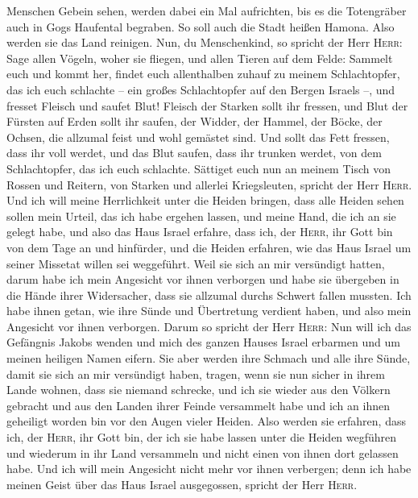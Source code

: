 Menschen Gebein sehen, werden dabei ein Mal aufrichten, bis es die
Totengräber auch in Gogs Haufental begraben.  So soll
auch die Stadt heißen Hamona. Also werden sie das Land reinigen.
 Nun, du Menschenkind, so spricht der Herr \textsc{Herr}:
Sage allen Vögeln, woher sie fliegen, und allen Tieren auf dem Felde:
Sammelt euch und kommt her, findet euch allenthalben zuhauf zu meinem
Schlachtopfer, das ich euch schlachte -- ein großes Schlachtopfer auf
den Bergen Israels --, und fresset Fleisch und saufet Blut!
 Fleisch der Starken sollt ihr fressen, und Blut der
Fürsten auf Erden sollt ihr saufen, der Widder, der Hammel, der Böcke,
der Ochsen, die allzumal feist und wohl gemästet sind. 
Und sollt das Fett fressen, dass ihr voll werdet, und das Blut saufen,
dass ihr trunken werdet, von dem Schlachtopfer, das ich euch schlachte.
 Sättiget euch nun an meinem Tisch von Rossen und
Reitern, von Starken und allerlei Kriegsleuten, spricht der Herr
\textsc{Herr}.  Und ich will meine Herrlichkeit unter die
Heiden bringen, dass alle Heiden sehen sollen mein Urteil, das ich habe
ergehen lassen, und meine Hand, die ich an sie gelegt habe,
 und also das Haus Israel erfahre, dass ich, der
\textsc{Herr}, ihr Gott bin von dem Tage an und hinfürder,
 und die Heiden erfahren, wie das Haus Israel um seiner
Missetat willen sei weggeführt. Weil sie sich an mir versündigt hatten,
darum habe ich mein Angesicht vor ihnen verborgen und habe sie übergeben
in die Hände ihrer Widersacher, dass sie allzumal durchs Schwert fallen
mussten.  Ich habe ihnen getan, wie ihre Sünde und
Übertretung verdient haben, und also mein Angesicht vor ihnen verborgen.
 Darum so spricht der Herr \textsc{Herr}: Nun will ich
das Gefängnis Jakobs wenden und mich des ganzen Hauses Israel erbarmen
und um meinen heiligen Namen eifern.  Sie aber werden
ihre Schmach und alle ihre Sünde, damit sie sich an mir versündigt
haben, tragen, wenn sie nun sicher in ihrem Lande wohnen, dass sie
niemand schrecke,  und ich sie wieder aus den Völkern
gebracht und aus den Landen ihrer Feinde versammelt habe und ich an
ihnen geheiligt worden bin vor den Augen vieler Heiden. 
Also werden sie erfahren, dass ich, der \textsc{Herr}, ihr Gott bin, der
ich sie habe lassen unter die Heiden wegführen und wiederum in ihr Land
versammeln und nicht einen von ihnen dort gelassen habe. 
Und ich will mein Angesicht nicht mehr vor ihnen verbergen; denn ich
habe meinen Geist über das Haus Israel ausgegossen, spricht der Herr
\textsc{Herr}.

